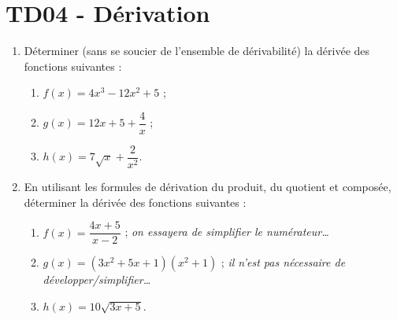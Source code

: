 \documentclass[a4paper,11pt]{article}
\author{Pierquet}
\title{\nomfichier}
\begin{document}
\pagestyle{fancy}

\setcounter{numexos}{0}

\part{TD04 - Dérivation}

\smallskip

\nomprenomtcbox

\smallskip

%
\begin{enumerate}
	\item Déterminer (sans se soucier de l'ensemble de dérivabilité) la dérivée des fonctions suivantes :
	\begin{enumerate}
		\item $f(x)=4x^3-12x^2+5$ ;
		\item $g(x)=12x+5+\dfrac4x$ ;
		\item $h(x)=7\sqrt{x}+\dfrac{2}{x^2}$.
	\end{enumerate}
	\item En utilisant les formules de dérivation du produit, du quotient et composée, déterminer la dérivée des fonctions suivantes :
	\begin{enumerate}
		\item $f(x)=\dfrac{4x+5}{x-2}$ ; \tabto{5.5cm}\textit{\footnotesize \faHandPointRight[regular] \small on essayera de simplifier le numérateur\ldots}
		\item $g(x)=(3x^2+5x+1)(x^2+1)$ ; \tabto{5.5cm}\textit{\footnotesize \faHandPointRight[regular] \small il n'est pas nécessaire de développer/simplifier\ldots}
		\item $h(x)=10\sqrt{3x+5}$.
	\end{enumerate}
\end{enumerate}

\medskip
\end{document}
